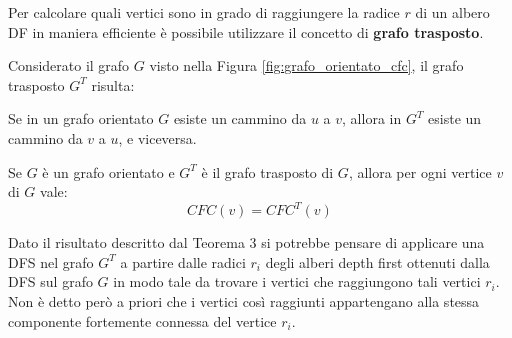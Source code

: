 Per calcolare quali vertici sono in grado di raggiungere la radice $r$ di un albero DF in maniera efficiente è possibile utilizzare il concetto di \textbf{grafo trasposto}.


\begin{example}
	Considerato il grafo $G$ visto nella Figura \ref{fig:grafo_orientato_cfc}, il grafo trasposto $G^{T}$ risulta:
\begin{center}
		\label{fig:grafo_orientato_cfc_trasposto}
\end{center}
\end{example}


\begin{teorbox}
		Se in un grafo orientato $G$ esiste un cammino da $u$ a $v$, allora in $G^{T}$ esiste un cammino da $v$ a $u$, e viceversa.
\end{teorbox}


\begin{corolbox}
		Se $G$ è un grafo orientato e $G^{T}$ è il grafo trasposto di $G$, allora per ogni vertice $v$ di $G$ vale:
	\begin{displaymath}
		CFC(v) = CFC^{T}(v)
	\end{displaymath}
\end{corolbox}

Dato il risultato descritto dal Teorema 3 si potrebbe pensare di applicare una DFS nel grafo $G^{T}$ a partire dalle radici $r_{i}$ degli alberi depth first ottenuti dalla DFS sul grafo $G$ in modo tale da trovare i vertici che raggiungono tali vertici $r_{i}$. Non è detto però a priori che i vertici così raggiunti appartengano alla stessa componente fortemente connessa del vertice $r_{i}$.

